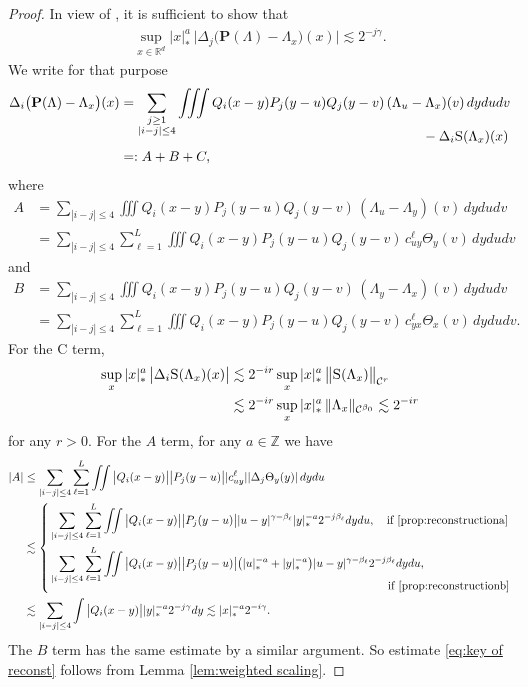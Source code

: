 \documentclass[10pt]{amsart}
\theoremstyle{plain}
\theoremstyle{definition}
\newcommand{\bfP}{\mathbf{P}}
\newcommand{\bbR}{\mathbb{R}}
\newcommand{\bbZ}{\mathbb{Z}}
\newcommand{\mcC}{\mathcal{C}}
\begin{document}
\begin{proof}
In view of \cite[Prop.\,9]{BH}, it is sufficient to show that
\begin{align}\label{eq:key of reconst}
\sup_{x\in\bbR^d}|x|_*^a\,\Big|\Delta_j\bigl(\bfP(\Lambda)-\Lambda_x\bigr)(x)\Big| \lesssim 2^{-j\gamma}.
\end{align}
We write for that purpose
\begin{align*}
\Delta_i\bigl(\bfP(\Lambda)-\Lambda_x\bigr)(x)&=\sum_{\substack{j\ge1\\ |i-j|\le4}}\iiint Q_i(x-y)P_j(y-u)Q_j(y-v)\,(\Lambda_u-\Lambda_x)(v)\,dydudv\\[-10pt]
& \hspace*{7.8cm}- \Delta_i\textsc{S}(\Lambda_x)(x)\\
&=:A+B+C,
\end{align*}
where
\begin{align*}
A
&=\sum_{|i-j|\le4}\iiint Q_i(x-y)P_j(y-u)Q_j(y-v)\,(\Lambda_u-\Lambda_y)(v)\,dydudv\\
&=\sum_{|i-j|\le4}\sum_{\ell=1}^L \iiint Q_i(x-y)P_j(y-u)Q_j(y-v)\,c_{uy}^\ell\Theta_y(v)\,dydudv
\end{align*}
and
\begin{align*}
B
&=\sum_{|i-j|\le4}\iiint Q_i(x-y)P_j(y-u)Q_j(y-v)\,(\Lambda_y-\Lambda_x)(v)\,dydudv\\
&=\sum_{|i-j|\le4}\sum_{\ell=1}^L \iiint Q_i(x-y)P_j(y-u)Q_j(y-v)\,c_{yx}^\ell\Theta_x(v)\,dydudv.
\end{align*}
For the C term,
\begin{align*}
\sup_x|x|_*^a\,\big|\Delta_i\textsc{S}(\Lambda_x)(x)\big| &\lesssim2^{-ir}\sup_x|x|_*^a\,\big\|\textsc{S}(\Lambda_x)\big\|_{\mcC^r} \\
&\lesssim 2^{-ir}\sup_x|x|_*^a\,\|\Lambda_x\|_{\mcC^{\beta_0}}\lesssim2^{-ir}
\end{align*}
for any $r>0$. For the $A$ term, for any $a\in\bbZ$ we have
\begin{align*}
|A|&
\le\sum_{|i-j|\le4}\sum_{\ell=1}^L \iint \big|Q_i(x-y)\big| \big|P_j(y-u)\big| |c_{uy}^\ell| |\Delta_j\Theta_y(y)|\,dydu\\
&\lesssim
\left\{
\begin{aligned}
&\sum_{|i-j|\le4}\sum_{\ell=1}^L \iint \big|Q_i(x-y)\big| \big|P_j(y-u)\big|
|u-y|^{\gamma-\beta_\ell}|y|_*^{-a}2^{-j\beta_\ell} dydu,\quad\text{if \eqref{prop:reconstructiona}}\\
&\sum_{|i-j|\le4}\sum_{\ell=1}^L \iint \big|Q_i(x-y)\big| \big|P_j(y-u)\big|
\bigl(|u|_*^{-a}+|y|_*^{-a}\bigr)|u-y|^{\gamma-\beta_\ell}2^{-j\beta_\ell} dydu,\\[-8pt]
&\hspace*{10.3cm}\text{if \eqref{prop:reconstructionb}}
\end{aligned}
\right.\\
&\lesssim\sum_{|i-j|\le4}
\int\big|Q_i(x-y)\big||y|_*^{-a}2^{-j\gamma}dy
\lesssim |x|_*^{-a}2^{-i\gamma}.
\end{align*}
The $B$ term has the same estimate by a similar argument. So estimate \eqref{eq:key of reconst} follows from Lemma \ref{lem:weighted scaling}.


\end{proof}
\end{document}

